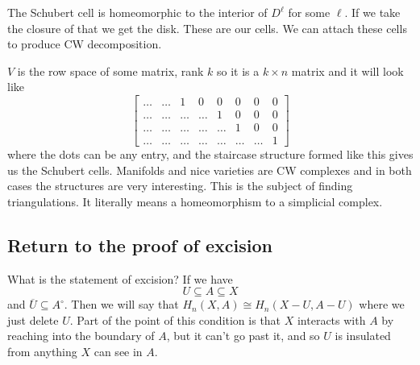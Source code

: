 \documentclass[12pt]{article}
\theoremstyle{definition}
\begin{document}
	The Schubert cell is homeomorphic to the interior of $D^\ell$ for some $\ell$. If we take the closure of that we get the disk. These are our cells. We can attach these cells to produce CW decomposition. 
	
	$V$ is the row space of some matrix, rank $k$ so it is a $k\times n$ matrix and it will look like \[
	\begin{bmatrix}
	\dots & \dots & 1 & 0 & 0 & 0 & 0 & 0 \\
	\dots & \dots & \dots & \dots & 1 & 0 & 0 & 0 \\
	\dots & \dots & \dots & \dots & \dots & 1 & 0 & 0\\
	\dots & \dots & \dots & \dots & \dots & \dots & \dots & 1 
	\end{bmatrix}
	\]
	where the dots can be any entry, and the staircase structure formed like this gives us the Schubert cells. Manifolds and nice varieties are CW complexes and in both cases the structures are very interesting. This is the subject of finding triangulations. It literally means a homeomorphism to a simplicial complex. 
	
	\subsection{Return to the proof of excision}
	What is the statement of excision?
	If we have \[
	U\subseteq A \subseteq X
	\] 
	and $\overline{U}\subseteq A^\circ$. Then we will say that $H_n(X,A)\cong H_n(X-U,A-U)$ where we just delete $U$. Part of the point of this condition is that $X$ interacts with $A$ by reaching into the boundary of $A$, but it can't go past it, and so $U$ is insulated from anything $X$ can see in $A$.
	
\end{document}
